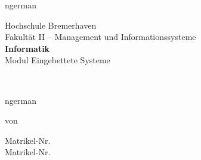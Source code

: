\begin{titlepage}
  \pagestyle{empty}
  \centering

  \vspace*{0.5cm}
  \begin{otherlanguage*}{ngerman}
    \begin{sffamily}
      {
        \Large
        Hochschule Bremerhaven\\[1em]
        Fakultät II -- Management und Informationssysteme\\[0.1em]
        \textbf{Informatik}\\[0.5em]
        Modul Eingebettete Systeme
      }
    \end{sffamily}
  \end{otherlanguage*}

  \vspace*{3cm}

  \begin{sffamily}
    \huge \bfseries
    \makeatletter
    \@title
    \makeatother
    \\
  \end{sffamily}

  \vspace*{1cm}

  \begin{otherlanguage*}{ngerman}
    
    \vspace*{3cm}
    
    von\\[0.75em]
    {
      \large
      \textbf{\authorA}\quad Matrikel-Nr. \matrikelnrA\\
      \textbf{\authorB}\quad Matrikel-Nr. \matrikelnrB

      \vspace*{2cm}
      \makeatletter
      \@date
      \makeatother
    }
    \vfill
  \end{otherlanguage*}
\end{titlepage}
